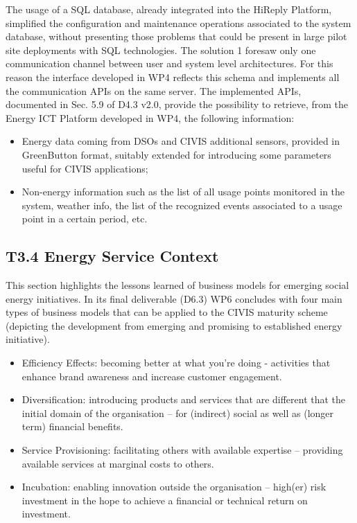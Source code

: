 The usage of a SQL database, already integrated into the HiReply Platform, simplified the configuration and maintenance operations associated to the system database, without presenting those problems that could be present in large pilot site deployments with SQL technologies.
The solution 1 foresaw only one communication channel between user and system level architectures. For this reason the interface developed in WP4 reflects this schema and implements all the communication APIs on the same server.
The implemented APIs, documented in Sec. 5.9 of D4.3 v2.0, provide the possibility to retrieve, from the Energy ICT Platform developed in WP4, the following information:

\begin{itemize}
\item Energy data coming from DSOs and CIVIS additional sensors, provided in GreenButton format, suitably extended for introducing some parameters useful for CIVIS applications;
\item Non-energy information such as the list of all usage points monitored in the system, weather info, the list of the recognized events associated to a usage point in a certain period, etc. 
\end{itemize}

\subsection{T3.4 Energy Service Context}

This section highlights the lessons learned of business models for emerging social energy initiatives.
In its final deliverable (D6.3) WP6 concludes with four main types of business models that can be applied to the CIVIS maturity scheme (depicting the development from emerging and promising to established energy initiative). 

\begin{itemize}
\item Efficiency Effects: becoming better at what you're doing - activities that enhance brand awareness and increase customer engagement.
\item Diversification: introducing products and services that are different that the initial domain of the organisation -- for (indirect) social as well as (longer term) financial benefits. 
\item Service Provisioning: facilitating others with available expertise -- providing available services at marginal costs to others.
\item Incubation: enabling innovation outside the organisation -- high(er) risk investment in the hope to achieve a financial or technical return on investment. 
\end{itemize}

